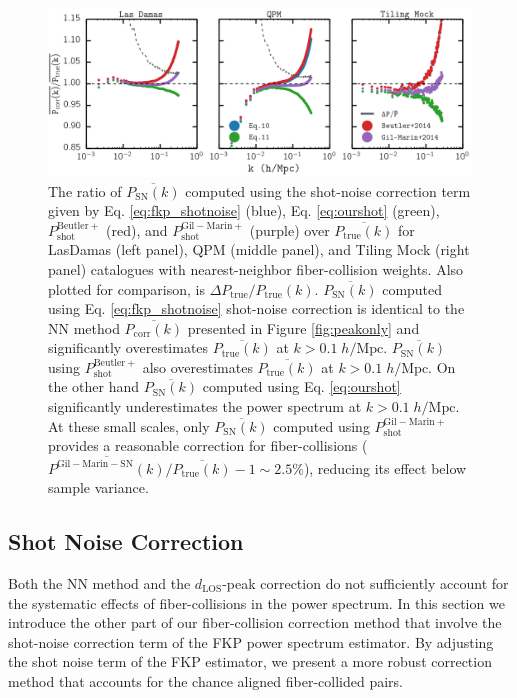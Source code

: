 \documentclass{emulateapj}
\begin{document}
\begin{figure}
\begin{center}
\includegraphics[scale=0.55]{fcpaper_pk_shotnoiseonly_comp.png}
\caption{The ratio of $\overline{P_\mathrm{SN}(k)}$ computed using the shot-noise correction term given by Eq. \ref{eq:fkp_shotnoise} (blue), Eq. \ref{eq:ourshot} (green), $P^\mathrm{Beutler+}_\mathrm{shot}$ (red), and $P^{\mathrm{Gil-Marin+}}_\mathrm{shot}$ (purple) over $\overline{P_\mathrm{true}(k)}$ for LasDamas (left panel), QPM (middle panel), and Tiling Mock (right panel) catalogues with nearest-neighbor fiber-collision weights. Also plotted for comparison, is $\Delta P_\mathrm{true}/P_\mathrm{true}(k)$. $\overline{P_\mathrm{SN}(k)}$ computed using Eq. \ref{eq:fkp_shotnoise} shot-noise correction is identical to the NN method $\overline{P_\mathrm{corr}(k)}$ presented in Figure \ref{fig:peakonly} and significantly overestimates $\overline{P_\mathrm{true}(k)}$ at $k > 0.1 \; h/\mathrm{Mpc}$. $\overline{P_\mathrm{SN}(k)}$ using $P^\mathrm{Beutler+}_\mathrm{shot}$ also overestimates $\overline{P_\mathrm{true}(k)}$ at $k > 0.1 \; h/\mathrm{Mpc}$. On the other hand $\overline{P_\mathrm{SN}(k)}$ computed using Eq. \ref{eq:ourshot} significantly underestimates the power spectrum at $k > 0.1 \; h/\mathrm{Mpc}$. At these small scales, only $\overline{P_\mathrm{SN}(k)}$ computed using $P^\mathrm{Gil-Marin+}_\mathrm{shot}$ provides a reasonable correction for fiber-collisions ($\overline{P^\mathrm{Gil-Marin-SN}(k)}/\overline{P_\mathrm{true}(k)} -1 \sim 2.5 \%$), reducing its effect below sample variance. } \label{fig:shotnoise}
\end{center}
\end{figure}
\subsection{Shot Noise Correction} \label{sec:shotnoise} 
Both the NN method and the $d_\mathrm{LOS}$-peak correction do not sufficiently account for the systematic effects of fiber-collisions in the power spectrum. In this section we introduce the other part of our fiber-collision correction method that involve the shot-noise correction term of the FKP power spectrum estimator. By adjusting the shot noise term of the FKP estimator, we present a more robust correction method that accounts for the chance aligned fiber-collided pairs. 
\end{document}
